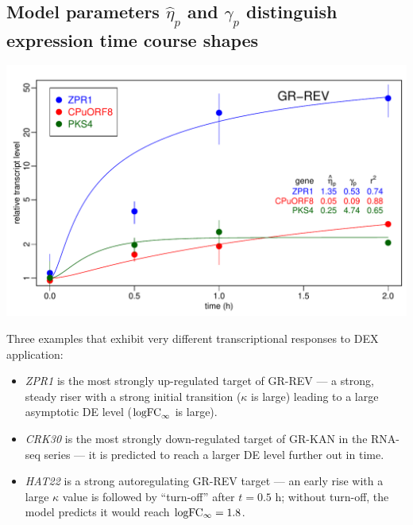 \documentclass[aspb,landscape]{a0poster}
\newlength{\figwidth}
\newlength{\figtopspace}
\begin{document}
\begin{multicols}{3}
  \subsection*{Model parameters $\hat{\eta}_p$ and $\gamma_p$ distinguish expression time course shapes}
  
  \begin{center}\vspace{\figtopspace}
    \includegraphics[width=\figwidth]{ZPR1-CPuORF8-PKS4}
  \end{center}

  Three examples that exhibit very different transcriptional responses to DEX application:
  \begin{itemize}
  \item \textit{ZPR1} is the most strongly up-regulated target of GR-REV --- a strong, steady riser with a strong initial transition ($\kappa$ is large) leading to a large asymptotic DE level (${\rm logFC}_\infty$ is large).
  \item \textit{CRK30} is the most strongly down-regulated target of GR-KAN in the RNA-seq series --- it is predicted to reach a larger DE level further out in time.
  \item \textit{HAT22} is a strong autoregulating GR-REV target --- an early rise with a large $\kappa$ value is followed by ``turn-off'' after $t=0.5$ h; without turn-off, the model predicts it would reach $\rm logFC_\infty=1.8$.
  \end{itemize}


\end{multicols}
\end{document}
